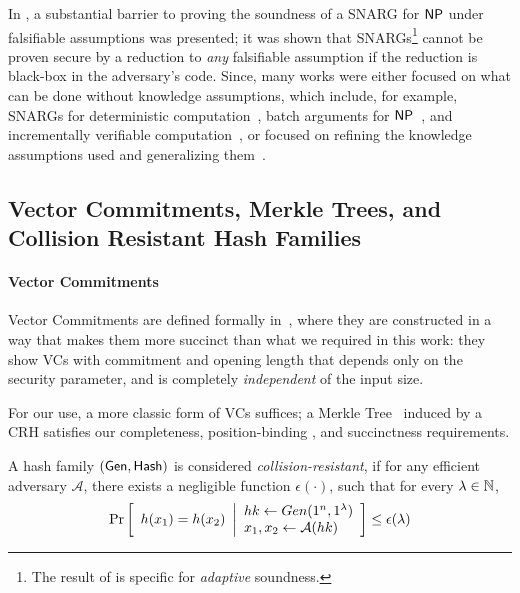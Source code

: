In \cite{gentry2011separating}, a substantial barrier to proving the soundness of a SNARG for ${\mathsf{NP}}$ under falsifiable assumptions was presented; it was shown that SNARGs\footnote{
The result of \cite{gentry2011separating} is specific for \emph{adaptive} soundness.
} cannot be proven secure by a reduction to \emph{any} falsifiable assumption if the reduction is black-box in the adversary's code. Since, many works were either focused on what can be done without knowledge assumptions, which include,
for example, SNARGs for deterministic computation~\cite{kalai2019delegate, jawale2021snargs, choudhuri2021snargs},
batch arguments for ${\mathsf{NP}}$~\cite{choudhuri2021non, hulett2022snargs, devadas2022rate, cryptoeprint:2022/1320},
and incrementally verifiable computation~\cite{paneth2022incrementally},
or focused on refining the knowledge assumptions used and generalizing them~\cite{bitansky2012extractable}.


\subsection{Vector Commitments, Merkle Trees, and Collision Resistant Hash Families}
\paragraph{Vector Commitments}
Vector Commitments are defined formally in~\cite{catalano2013vector}, where they are constructed in a way that makes them more succinct than what we required in this work: they show VCs  with commitment and opening length that depends only on the security parameter, and is completely \emph{independent} of the input size.

For our use, a more classic form of VCs suffices; a Merkle Tree~\cite{merkle1989certified} induced by a CRH satisfies our completeness, position-binding , and succinctness requirements.
\begin{definition} 
    A hash family $(\mathsf{Gen}, \mathsf{Hash})$ is considered \emph{collision-resistant}, if for any efficient adversary $\mathcal{A}$, there exists a negligible function $\epsilon(\cdot)$, such that for every $\lambda\in \mathbb{N}$,
    \begin{gather*}
        \underset{}{\text{Pr}}\left [
        \begin{array}{ll}
        h(x_1)=h(x_2)
        \end{array}
        \middle\vert
        \begin{array}{ll}
             hk \leftarrow Gen(1^n, 1^\lambda) \\
             x_1, x_2 \leftarrow\mathcal{A}(hk)
        \end{array}
        \right ] \leq \epsilon(\lambda)
    \end{gather*}
\end{definition}

